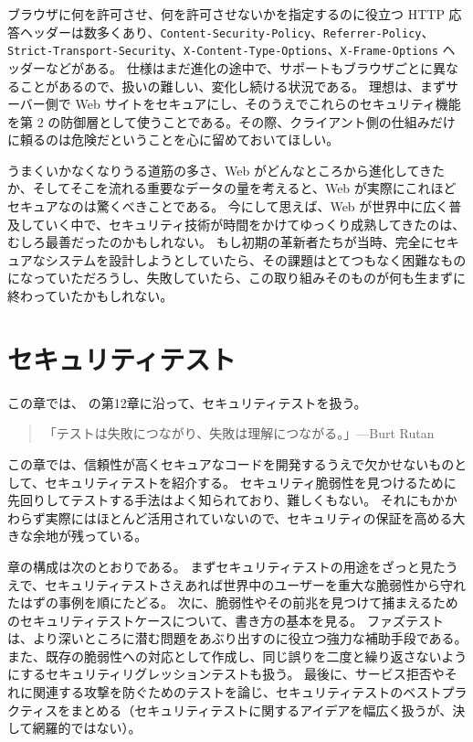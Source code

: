 \documentclass[uplatex]{jsarticle}
\begin{document}
ブラウザに何を許可させ、何を許可させないかを指定するのに役立つ HTTP 応答ヘッダーは数多くあり、\texttt{Content-Security-Policy}、\texttt{Referrer-Policy}、\texttt{Strict-Transport-Security}、\texttt{X-Content-Type-Options}、\texttt{X-Frame-Options} ヘッダーなどがある。
仕様はまだ進化の途中で、サポートもブラウザごとに異なることがあるので、扱いの難しい、変化し続ける状況である。
理想は、まずサーバー側で Web サイトをセキュアにし、そのうえでこれらのセキュリティ機能を第 2 の防御層として使うことである。その際、クライアント側の仕組みだけに頼るのは危険だということを心に留めておいてほしい。

うまくいかなくなりうる道筋の多さ、Web がどんなところから進化してきたか、そしてそこを流れる重要なデータの量を考えると、Web が実際にこれほどセキュアなのは驚くべきことである。
今にして思えば、Web が世界中に広く普及していく中で、セキュリティ技術が時間をかけてゆっくり成熟してきたのは、むしろ最善だったのかもしれない。
もし初期の革新者たちが当時、完全にセキュアなシステムを設計しようとしていたら、その課題はとてつもなく困難なものになっていただろうし、失敗していたら、この取り組みそのものが何も生まずに終わっていたかもしれない。

\newpage

\section{セキュリティテスト}

この章では、\cite{Kohnfelder2021} の第12章に沿って、セキュリティテストを扱う。

\begin{quote}
「テストは失敗につながり、失敗は理解につながる。」\hfill ---Burt Rutan
\end{quote}

この章では、信頼性が高くセキュアなコードを開発するうえで欠かせないものとして、セキュリティテストを紹介する。
セキュリティ脆弱性を見つけるために先回りしてテストする手法はよく知られており、難しくもない。
それにもかかわらず実際にはほとんど活用されていないので、セキュリティの保証を高める大きな余地が残っている。

章の構成は次のとおりである。
まずセキュリティテストの用途をざっと見たうえで、セキュリティテストさえあれば世界中のユーザーを重大な脆弱性から守れたはずの事例を順にたどる。
次に、脆弱性やその前兆を見つけて捕まえるためのセキュリティテストケースについて、書き方の基本を見る。
ファズテストは、より深いところに潜む問題をあぶり出すのに役立つ強力な補助手段である。
また、既存の脆弱性への対応として作成し、同じ誤りを二度と繰り返さないようにするセキュリティリグレッションテストも扱う。
最後に、サービス拒否やそれに関連する攻撃を防ぐためのテストを論じ、セキュリティテストのベストプラクティスをまとめる（セキュリティテストに関するアイデアを幅広く扱うが、決して網羅的ではない）。
\end{document}
